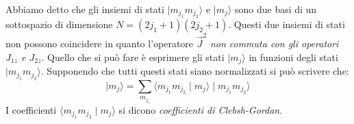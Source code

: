 Abbiamo detto che gli insiemi di stati $ \mid m_{j_{1}}
m_{j_{2}}\rangle$ e $\mid m_{j}\rangle$ sono due basi di un sottospazio di
dimensione $ N = \left( 2j_{1} + 1\right) \left(2j_{2} +1\right)$. Questi due
insiemi di stati non possono coincidere in quanto l'operatore $\vec{J}^{2}$
\textit{non commuta con gli operatori $J_{1z}$ e $J_{2z}$}. Quello che si può
fare è esprimere gli stati $\mid m_{j}\rangle$ in funzioni degli stati $\mid
m_{j_{1}} m_{j_{2}}\rangle$. Supponendo che tutti questi stati siano
normalizzati si può scrivere che:
\begin{equation}
\mid m_{j}\rangle = \sum _{m_{j_{1}}} \langle m_{j_{1}} m_{j_{2}} \mid m_{j}
\rangle \mid m_{j_{1}} m_{j_{2}} \rangle
\end{equation}
I coefficienti $\langle m_{j_{1}} m_{j_{2}} \mid m_{j} \rangle$ si dicono
\textit{coefficienti di Clebsh-Gordan}.


